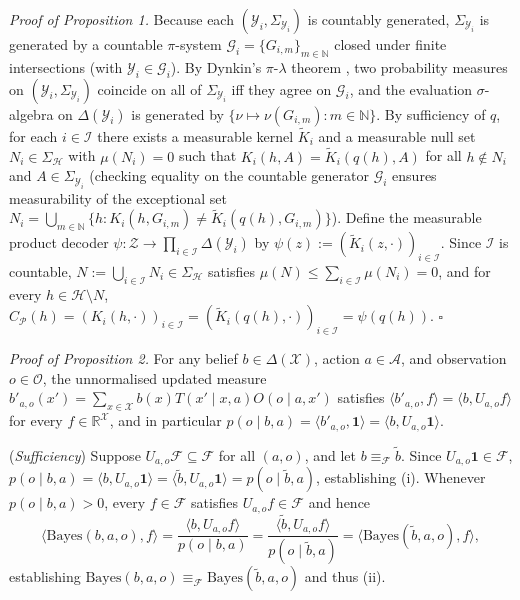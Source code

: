 \documentclass[12pt,letterpaper]{article}
\begin{document}
\emph{Proof of Proposition 1.} Because each
\((\mathcal{Y}_i, \Sigma_{\mathcal{Y}_i})\) is countably generated,
\(\Sigma_{\mathcal{Y}_i}\) is generated by a countable \(\pi\)-system
\(\mathcal{G}_i = \{G_{i,m}\}_{m \in \mathbb{N}}\) closed under finite
intersections (with \(\mathcal{Y}_i \in \mathcal{G}_i\)). By Dynkin's
\(\pi\)-\(\lambda\) theorem \citep{kallenberg2021}, two probability
measures on \((\mathcal{Y}_i, \Sigma_{\mathcal{Y}_i})\) coincide on all
of \(\Sigma_{\mathcal{Y}_i}\) iff they agree on \(\mathcal{G}_i\), and
the evaluation \(\sigma\)-algebra on \(\Delta(\mathcal{Y}_i)\) is
generated by \(\{ \nu \mapsto \nu(G_{i,m}) : m \in \mathbb{N}\}\). By
sufficiency of \(q\), for each \(i \in \mathcal{I}\) there exists a
measurable kernel \(\widetilde{K}_i\) and a measurable null set
\(N_i \in \Sigma_{\mathcal{H}}\) with \(\mu(N_i) = 0\) such that
\(K_i(h, A) = \widetilde{K}_i(q(h), A)\) for all \(h \notin N_i\) and
\(A \in \Sigma_{\mathcal{Y}_i}\) (checking equality on the countable
generator \(\mathcal{G}_i\) ensures measurability of the exceptional set
\(N_i = \bigcup_{m \in \mathbb{N}} \{h : K_i(h, G_{i,m}) \neq \widetilde{K}_i(q(h), G_{i,m})\}\)).
Define the measurable product decoder
\(\psi: \mathcal{Z} \to \prod_{i \in \mathcal{I}} \Delta(\mathcal{Y}_i)\)
by \(\psi(z) := (\widetilde{K}_i(z, \cdot))_{i \in \mathcal{I}}\). Since
\(\mathcal{I}\) is countable,
\(N := \bigcup_{i \in \mathcal{I}} N_i \in \Sigma_{\mathcal{H}}\)
satisfies \(\mu(N) \le \sum_{i \in \mathcal{I}} \mu(N_i) = 0\), and for
every \(h \in \mathcal{H} \setminus N\),
\(C_{\mathcal{P}}(h) = (K_i(h,\cdot))_{i \in \mathcal{I}} = (\widetilde{K}_i(q(h),\cdot))_{i \in \mathcal{I}} = \psi(q(h))\).
\(\square\)

\emph{Proof of Proposition 2.} For any belief
\(b \in \Delta(\mathcal{X})\), action \(a \in \mathcal{A}\), and
observation \(o \in \mathcal{O}\), the unnormalised updated measure
\(b'_{a,o}(x') = \sum_{x \in \mathcal{X}} b(x) T(x' \mid x,a) O(o \mid a,x')\)
satisfies \(\langle b'_{a,o}, f\rangle = \langle b, U_{a,o} f\rangle\)
for every \(f \in \mathbb{R}^{\mathcal{X}}\), and in particular
\(p(o \mid b, a) = \langle b'_{a,o}, \mathbf{1}\rangle = \langle b, U_{a,o}\mathbf{1}\rangle\).

(\emph{Sufficiency}) Suppose
\(U_{a,o}\mathcal{F} \subseteq \mathcal{F}\) for all \((a,o)\), and let
\(b \equiv_{\mathcal{F}} \tilde{b}\). Since
\(U_{a,o}\mathbf{1} \in \mathcal{F}\),
\(p(o \mid b, a) = \langle b, U_{a,o}\mathbf{1}\rangle = \langle \tilde{b}, U_{a,o}\mathbf{1}\rangle = p(o \mid \tilde{b}, a)\),
establishing (i). Whenever \(p(o \mid b,a) > 0\), every
\(f \in \mathcal{F}\) satisfies \(U_{a,o}f \in \mathcal{F}\) and hence
\[\langle \mathrm{Bayes}(b,a,o), f\rangle = \frac{\langle b, U_{a,o}f\rangle}{p(o \mid b,a)} = \frac{\langle \tilde{b}, U_{a,o}f\rangle}{p(o \mid \tilde{b},a)} = \langle \mathrm{Bayes}(\tilde{b},a,o), f\rangle,\]
establishing
\(\mathrm{Bayes}(b,a,o) \equiv_{\mathcal{F}} \mathrm{Bayes}(\tilde{b},a,o)\)
and thus (ii).
\end{document}
